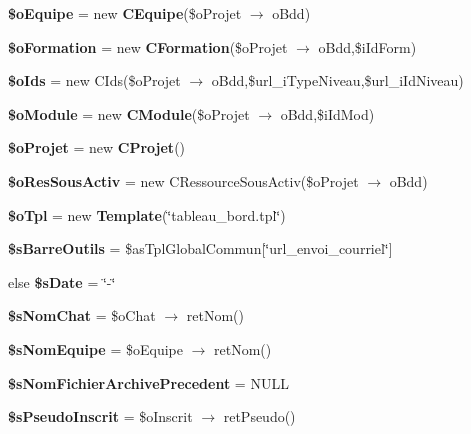 \begin{CompactItemize}
\item 
\textbf{\$oEquipe} = new {\bf CEquipe}(\$oProjet $\rightarrow$ oBdd)\label{tableau__bord_8php_f794066fd612bb940c5b1e84e9cf8ad9}

\item 
\textbf{\$oFormation} = new {\bf CFormation}(\$oProjet $\rightarrow$ oBdd,\$iIdForm)\label{tableau__bord_8php_5dbadfcf71ff9339b4bb2320f35a7b04}

\item 
\textbf{\$oIds} = new CIds(\$oProjet $\rightarrow$ oBdd,\$url\_\-iTypeNiveau,\$url\_\-iIdNiveau)\label{tableau__bord_8php_87e9fcad45d9de21f44bfbb0e94f46cd}

\item 
\textbf{\$oModule} = new {\bf CModule}(\$oProjet $\rightarrow$ oBdd,\$iIdMod)\label{tableau__bord_8php_659cdbae85c53cc89808c9ff105614ad}

\item 
\textbf{\$oProjet} = new {\bf CProjet}()\label{tableau__bord_8php_ec412e7ac901485e72b77d2185159421}

\item 
\textbf{\$oResSousActiv} = new CRessourceSousActiv(\$oProjet $\rightarrow$ oBdd)\label{tableau__bord_8php_637f8fddd951261188dcd2e48e537f54}

\item 
\textbf{\$oTpl} = new {\bf Template}(\char`\"{}tableau\_\-bord.tpl\char`\"{})\label{tableau__bord_8php_7de57ba665b7c068e98ea46469be2865}

\item 
\textbf{\$sBarreOutils} = \$asTplGlobalCommun[\char`\"{}url\_\-envoi\_\-courriel\char`\"{}]\label{tableau__bord_8php_bb6678b10e98640d38f7fd08298f2207}

\item 
else \textbf{\$sDate} = \char`\"{}-\char`\"{}\label{tableau__bord_8php_75cc78b03d984bdda5402b50fba74ed7}

\item 
\textbf{\$sNomChat} = \$oChat $\rightarrow$ retNom()\label{tableau__bord_8php_f10fd6e6be3f67069554b2fc9eecc318}

\item 
\textbf{\$sNomEquipe} = \$oEquipe $\rightarrow$ retNom()\label{tableau__bord_8php_80459fde8b65d00eca874c7dc372daf6}

\item 
\textbf{\$sNomFichierArchivePrecedent} = NULL\label{tableau__bord_8php_22c5934cb13991f142b3be4a9a767a3e}

\item 
\textbf{\$sPseudoInscrit} = \$oInscrit $\rightarrow$ retPseudo()\label{tableau__bord_8php_fbc975ac9d6bf189539f16374c5ef0a4}


\end{CompactItemize}
